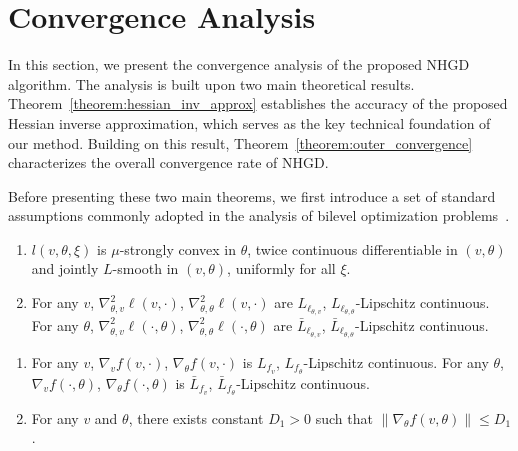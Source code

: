 \documentclass[11 pt]{article}
\begin{document}
\section{Convergence Analysis}\label{sec:analysis}
In this section, we present the convergence analysis of the proposed NHGD algorithm. The analysis is built upon two main theoretical results. Theorem~\ref{theorem:hessian_inv_approx} establishes the accuracy of the proposed Hessian inverse approximation, which serves as the key technical foundation of our method. Building on this result, Theorem~\ref{theorem:outer_convergence} characterizes the overall convergence rate of NHGD.

Before presenting these two main theorems, we first introduce a set of standard assumptions commonly adopted in the analysis of bilevel optimization problems~\cite{ghadimi2018approximation, ji2021bilevel, arbel2021amortized, chen2021tighter, chen2022single, hong2023two}.

\begin{assumption}\label{as:l_inner} 
\begin{enumerate}[label=(\roman*)]
\item  $ l(v,\theta,\xi)$ is $\mu$-strongly convex in $\theta$, twice continuous differentiable in $(v,\theta)$ and jointly $L$-smooth in $(v,\theta)$, uniformly for all $\xi$.

\item  For any $v$,  $\nabla^2_{\theta,v}\ell(v,\cdot)$,  $\nabla^2_{\theta,\theta}\ell(v,\cdot)$ are  $L_{\ell_{\theta,v}}$, $L_{\ell_{\theta,\theta}}$-Lipschitz continuous. For any $\theta$,  $\nabla^2_{\theta,v}\ell(\cdot,\theta)$, $\nabla^2_{\theta,\theta}\ell(\cdot,\theta)$ are $\bar{L}_{\ell_{\theta,v}}$, $\bar{L}_{\ell_{\theta,\theta}}$-Lipschitz continuous.    
\end{enumerate}
\end{assumption}


\begin{assumption}\label{as:f_smoothness}

\begin{enumerate}[label=(\roman*)]
    \item  For any $v$, $\nabla_v f(v,\cdot)$, $\nabla_\theta f(v,\cdot)$ is $L_{f_v}$, $L_{f_\theta}$-Lipschitz continuous. For any $\theta$, $\nabla_v f(\cdot,\theta)$, $\nabla_\theta f(\cdot,\theta)$ is $\bar{L}_{f_v}$, $\bar{L}_{f_\theta}$-Lipschitz continuous.
    \item For any $v$ and $\theta$, there exists constant $D_1>0$ such that $\| \nabla_\theta f(v,\theta) \|\leq D_1$.
\end{enumerate}
\end{assumption}
\end{document}
